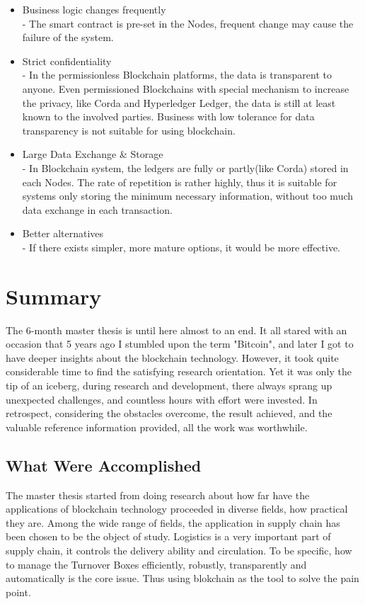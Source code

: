\begin{itemize}
	\item Business logic changes frequently\\
		- The smart contract is pre-set in the Nodes, frequent change may cause the failure of the system.
	\item Strict confidentiality\\
		- In the permissionless Blockchain platforms, the data is transparent to anyone. Even permissioned Blockchains with special mechanism to increase the privacy, like Corda and Hyperledger Ledger, the data is still at least known to the involved parties. Business with low tolerance for data transparency is not suitable for using blockchain. 
	\item Large Data Exchange \& Storage \\
		- In Blockchain system, the ledgers are fully or partly(like Corda) stored in each Nodes. The rate of repetition is rather highly, thus it is suitable for systems only storing the minimum necessary information, without too much data exchange in each transaction.\\
	\item Better alternatives\\
		- If there exists simpler, more mature options, it would be more effective.
\end{itemize}
 
\section{Summary}
The 6-month master thesis is until here almost to an end. It all stared with an occasion that 5 years ago I stumbled upon the term "Bitcoin", and later I got to have deeper insights about the blockchain technology. However, it took quite considerable time to find the satisfying research orientation. Yet it was only the tip of an iceberg, during research and development, there always sprang up unexpected challenges, and countless hours with effort were invested. In retrospect, considering the obstacles overcome, the result achieved, and the valuable reference information provided, all the work was worthwhile.

\subsection{What Were Accomplished}
The master thesis started from doing research about how far have the applications of blockchain technology proceeded in diverse fields, how practical they are. Among the wide range of fields, the application in supply chain has been chosen to be the object of study.
Logistics is a very important part of supply chain, it controls the delivery ability and circulation. To be specific, how to manage the Turnover Boxes efficiently, robustly, transparently and automatically is the core issue. Thus using blokchain as the tool to solve the pain point.\\

